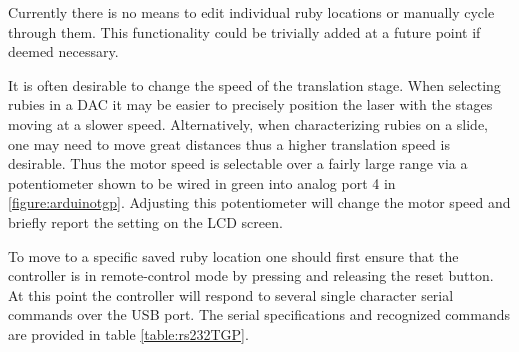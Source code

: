 Currently there is no means to edit individual ruby locations or manually cycle through them.  This functionality could be trivially added at a future point if deemed necessary.

It is often desirable to change the speed of the translation stage.  When selecting rubies in a DAC it may be easier to precisely position the laser with the stages moving at a slower speed.  Alternatively, when characterizing rubies on a slide, one may need to move great distances thus a higher translation speed is desirable.  Thus the motor speed is selectable over a fairly large range via a potentiometer shown to be wired in green into analog port 4 in \fig \ref{figure:arduinotgp}.  Adjusting this potentiometer will change the motor speed and briefly report the setting on the LCD screen.

To move to a specific saved ruby location one should first ensure that the controller is in remote-control mode by pressing and releasing the reset button.  At this point the controller will respond to several single character serial commands over the USB port.  The serial specifications and recognized commands are provided in table \ref{table:rs232TGP}.

